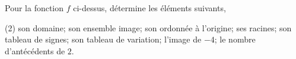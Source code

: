 %
%
    \begin{center}
        
    \end{center}
    Pour la fonction $f$ ci-dessus, détermine les éléments suivants,
    \begin{tasks}[after-item-skip=1em](2)
        \task son domaine;
        \task son ensemble image;
        \task son ordonnée à l'origine;
        \task ses racines;
        \task son tableau de signes;
        \task son tableau de variation;
        \task l'image de $-4$;
        \task le nombre d'antécédents de $2$.
    \end{tasks}
